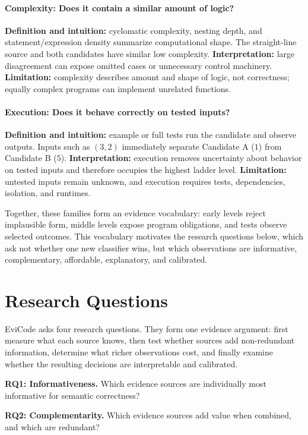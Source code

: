 ﻿\documentclass[conference]{IEEEtran}
\begin{document}
\paragraph{Complexity: Does it contain a similar amount of logic?}
\textbf{Definition and intuition:} cyclomatic complexity, nesting depth, and statement/expression density summarize computational shape. The straight-line source and both candidates have similar low complexity. \textbf{Interpretation:} large disagreement can expose omitted cases or unnecessary control machinery. \textbf{Limitation:} complexity describes amount and shape of logic, not correctness; equally complex programs can implement unrelated functions.

\paragraph{Execution: Does it behave correctly on tested inputs?}
\textbf{Definition and intuition:} example or full tests run the candidate and observe outputs. Inputs such as $(3,2)$ immediately separate Candidate A ($1$) from Candidate B ($5$). \textbf{Interpretation:} execution removes uncertainty about behavior on tested inputs and therefore occupies the highest ladder level. \textbf{Limitation:} untested inputs remain unknown, and execution requires tests, dependencies, isolation, and runtimes.

Together, these families form an evidence vocabulary: early levels reject implausible form, middle levels expose program obligations, and tests observe selected outcomes. This vocabulary motivates the research questions below, which ask not whether one new classifier wins, but which observations are informative, complementary, affordable, explanatory, and calibrated.

\section{Research Questions}
EviCode asks four research questions. They form one evidence argument: first measure what each source knows, then test whether sources add non-redundant information, determine what richer observations cost, and finally examine whether the resulting decisions are interpretable and calibrated.

\textbf{RQ1: Informativeness.} Which evidence sources are individually most informative for semantic correctness?

\textbf{RQ2: Complementarity.} Which evidence sources add value when combined, and which are redundant?
\end{document}
